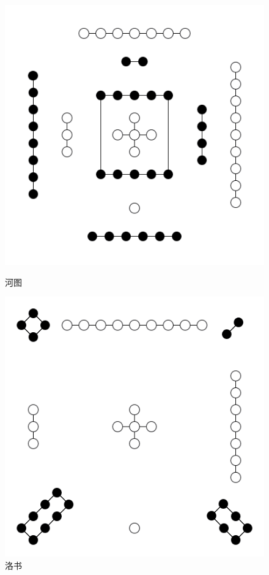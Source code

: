             \begin{figure}[!h]
                \centering
                \begin{minipage}[t]{.4\linewidth}
                    \centering
                    \includegraphics[width=.8\linewidth]{comb_notes/chap0_inc/河图.png}
                    \caption{河图}
                    \label{fig:0:hetu}
                \end{minipage}
                \begin{minipage}[t]{.4\linewidth}
                    \centering
                    \includegraphics[width=.8\linewidth]{comb_notes/chap0_inc/洛书.png}
                    \caption{洛书}
                    \label{fig:0:luoshu}
                \end{minipage}
            \end{figure}

